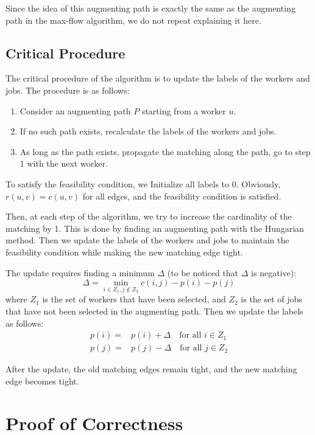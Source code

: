 \documentclass[a4paper,12pt]{article}
\begin{document}
Since the idea of this augmenting path is exactly the same as the augmenting path in the max-flow algorithm, we do not repeat explaining it here.

\subsection{Critical Procedure}

The critical procedure of the algorithm is to update the labels of the workers and jobs.
The procedure is as follows:
\begin{enumerate}
	\item Consider an augmenting path $P$ starting from a worker $u$.
	\item If no such path exists, recalculate the labels of the workers and jobs.
	\item As long as the path exists, propagate the matching along the path, go to step 1 with the next worker.
\end{enumerate}

To satisfy the feasibility condition, we Initialize all labels to 0.
Obviously, $r(u, v) = c(u, v)$ for all edges, and the feasibility condition is satisfied.

Then, at each step of the algorithm, we try to increase the cardinality of the matching by 1.
This is done by finding an augmenting path with the Hungarian method.
Then we update the labels of the workers and jobs to maintain the feasibility condition while making the new matching edge tight.

The update requires finding a minimum $\Delta$ (to be noticed that $\Delta$ is negative):
\begin{equation*}
	\Delta = \min_{i \in Z_1, j \not\in Z_2} c(i, j) - p(i) - p(j)
\end{equation*}
where $Z_1$ is the set of workers that have been selected, and $Z_2$ is the set of jobs that have not been selected in the augmenting path.
Then we update the labels as follows:
\begin{align*}
	p(i) =& p(i) + \Delta \quad \text{for all } i \in Z_1 \\
	p(j) =& p(j) - \Delta \quad \text{for all } j \in Z_2
\end{align*}

After the update, the old matching edges remain tight, and the new matching edge becomes tight.

\section{Proof of Correctness}
\end{document}
